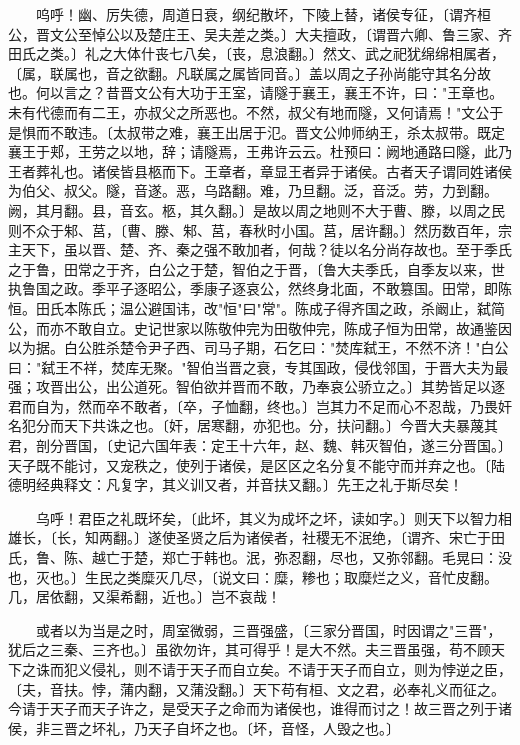 　　呜呼！幽、厉失德，周道日衰，纲纪散坏，下陵上替，诸侯专征，〔谓齐桓公，晋文公至悼公以及楚庄王、吴夫差之类。〕大夫擅政，〔谓晋六卿、鲁三家、齐田氏之类。〕礼之大体什丧七八矣，〔丧，息浪翻。〕然文、武之祀犹绵绵相属者，〔属，联属也，音之欲翻。凡联属之属皆同音。〕盖以周之子孙尚能守其名分故也。何以言之？昔晋文公有大功于王室，请隧于襄王，襄王不许，曰："王章也。未有代德而有二王，亦叔父之所恶也。不然，叔父有地而隧，又何请焉！"文公于是惧而不敢违。〔太叔带之难，襄王出居于氾。晋文公帅师纳王，杀太叔带。既定襄王于郏，王劳之以地，辞；请隧焉，王弗许云云。杜预曰：阙地通路曰隧，此乃王者葬礼也。诸侯皆县柩而下。王章者，章显王者异于诸侯。古者天子谓同姓诸侯为伯父、叔父。隧，音遂。恶，乌路翻。难，乃旦翻。泛，音泛。劳，力到翻。阙，其月翻。县，音玄。柩，其久翻。〕是故以周之地则不大于曹、滕，以周之民则不众于邾、莒，〔曹、滕、邾、莒，春秋时小国。莒，居许翻。〕然历数百年，宗主天下，虽以晋、楚、齐、秦之强不敢加者，何哉？徒以名分尚存故也。至于季氏之于鲁，田常之于齐，白公之于楚，智伯之于晋，〔鲁大夫季氏，自季友以来，世执鲁国之政。季平子逐昭公，季康子逐哀公，然终身北面，不敢篡国。田常，即陈恒。田氏本陈氏；温公避国讳，改"恒"曰"常"。陈成子得齐国之政，杀阚止，弑简公，而亦不敢自立。史记世家以陈敬仲完为田敬仲完，陈成子恒为田常，故通鉴因以为据。白公胜杀楚令尹子西、司马子期，石乞曰："焚库弑王，不然不济！"白公曰："弑王不祥，焚库无聚。"智伯当晋之衰，专其国政，侵伐邻国，于晋大夫为最强；攻晋出公，出公道死。智伯欲并晋而不敢，乃奉哀公骄立之。〕其势皆足以逐君而自为，然而卒不敢者，〔卒，子恤翻，终也。〕岂其力不足而心不忍哉，乃畏奸名犯分而天下共诛之也。〔奸，居寒翻，亦犯也。分，扶问翻。〕今晋大夫暴蔑其君，剖分晋国，〔史记六国年表：定王十六年，赵、魏、韩灭智伯，遂三分晋国。〕天子既不能讨，又宠秩之，使列于诸侯，是区区之名分复不能守而并弃之也。〔陆德明经典释文：凡复字，其义训又者，并音扶又翻。〕先王之礼于斯尽矣！

　　乌呼！君臣之礼既坏矣，〔此坏，其义为成坏之坏，读如字。〕则天下以智力相雄长，〔长，知两翻。〕遂使圣贤之后为诸侯者，社稷无不泯绝，〔谓齐、宋亡于田氏，鲁、陈、越亡于楚，郑亡于韩也。泯，弥忍翻，尽也，又弥邻翻。毛晃曰：没也，灭也。〕生民之类糜灭几尽，〔说文曰：糜，糁也；取糜烂之义，音忙皮翻。几，居依翻，又渠希翻，近也。〕岂不哀哉！

　　或者以为当是之时，周室微弱，三晋强盛，〔三家分晋国，时因谓之"三晋"，犹后之三秦、三齐也。〕虽欲勿许，其可得乎！是大不然。夫三晋虽强，苟不顾天下之诛而犯义侵礼，则不请于天子而自立矣。不请于天子而自立，则为悖逆之臣，〔夫，音扶。悖，蒲内翻，又蒲没翻。〕天下苟有桓、文之君，必奉礼义而征之。今请于天子而天子许之，是受天子之命而为诸侯也，谁得而讨之！故三晋之列于诸侯，非三晋之坏礼，乃天子自坏之也。〔坏，音怪，人毁之也。〕

